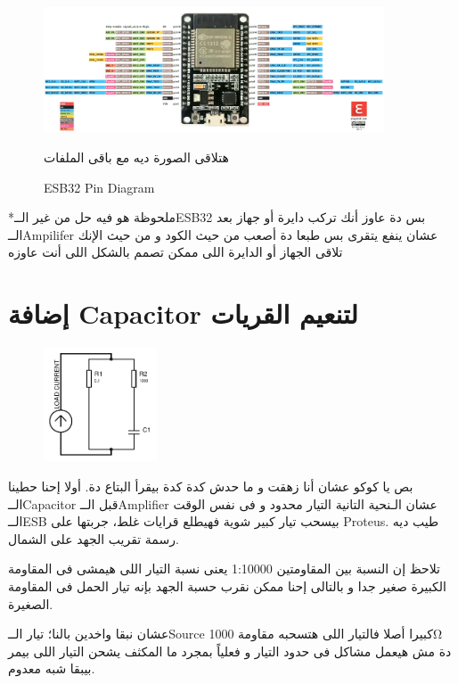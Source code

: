 \documentclass{article}
\begin{document}
\begin{figure}[h]
    \centering
    \includegraphics[width=0.9\textwidth]{ESB32 Pin diagram.jpg}
    \caption{\textenglish{ESB32 Pin Diagram}}\label{fig:ESP32PinDiagram}
    هتلاقى الصورة ديه مع باقى الملفات
\end{figure}

*ملحوظة هو فيه حل من غير الــ\textenglish{ESB32} بس دة عاوز أنك تركب دايرة أو جهاز بعد الــ\textenglish{Ampilifer}
عشان ينفع يتقرى بس طبعا دة أصعب من حيث الكود و من حيث الإنك تلاقى الجهاز أو الدايرة اللى ممكن تصمم بالشكل اللى أنت عاوزه



\section{إضافة \textenglish{Capacitor} لتنعيم القريات}
\needspace{144pt} \begin{figure}
    \includegraphics[width=0.3\textwidth]{smothing cap current and voltage approx .pdf}
    \caption{}\label{smcap}
\end{figure}
بص يا كوكو عشان أنا زهقت و ما حدش كدة كدة بيقرأ البتاع دة.
أولا إحنا حطينا الــ\textenglish{Capacitor} قبل الــ\textenglish{Amplifier} عشان الـنحية التانية التيار محدود و فى نفس الوقت الــ\textenglish{ESB} بيسحب تيار كبير شوية فهيطلع قرايات غلط، جربتها على
\textenglish{Proteus}. طيب ديه رسمة تقريب الجهد على الشمال. \par
تلاحظ إن النسبة بين المقاومتين \textenglish{1:10000} يعنى نسبة التيار اللى هيمشى فى المقاومة الكبيرة صغير جدا و بالتالى إحنا ممكن نقرب حسبة الجهد بإنه تيار الحمل فى المقاومة الصغيرة.\par
عشان نبقا واخدين بالنا؛ تيار الــ\textenglish{Source} كبيرا أصلا فالتيار اللى هتسحبه مقاومة \textenglish{1000Ω} دة مش هيعمل مشاكل فى حدود التيار و فعلياً بمجرد ما المكثف يشحن التيار اللى بيمر بيبقا شبه معدوم.
\end{document}
